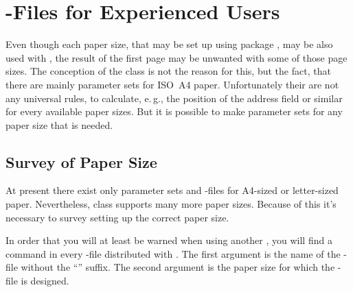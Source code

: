 \section{-Files for Experienced Users}
\label{sec:scrlttr2-experts.lcoFile}
%
%

%
Even though each paper size, that may be set up using package
, may be also used with , the result of the
first page may be unwanted with some of those page sizes. The conception of
the class is not the reason for this, but the fact, that there are mainly
parameter sets for ISO~A4 paper. Unfortunately their are not any universal
rules, to calculate, e.\,g., the position of the address field or similar for
every available paper sizes. But it is possible to make parameter sets for any
paper size that is needed.%
%
%


\subsection{Survey of Paper Size}
\label{sec:scrlttr2-experts.papersize}

At present there exist only parameter sets and -files for A4-sized
or letter-sized paper. Nevertheless, class  supports many more
paper sizes. Because of this it's necessary to survey setting up the correct
paper size.

\begin{Declaration}
\end{Declaration}
In order that you will at least be warned when using another , you will find a  command in every
-file distributed with {\KOMAScript}. The first argument is the name
of the -file without the ``'' suffix. The second argument
is the paper size for which the -file is designed.

